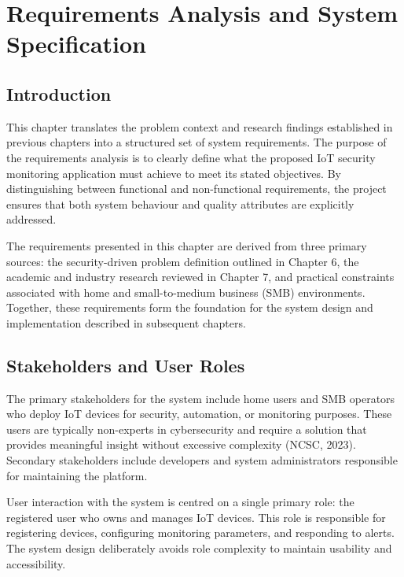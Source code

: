 \chapter{Requirements Analysis and System Specification}
\label{ch:req}

\section{Introduction}

This chapter translates the problem context and research findings established in previous chapters into a structured set of system requirements. The purpose of the requirements analysis is to clearly define what the proposed IoT security monitoring application must achieve to meet its stated objectives. By distinguishing between functional and non-functional requirements, the project ensures that both system behaviour and quality attributes are explicitly addressed.

The requirements presented in this chapter are derived from three primary sources: the security-driven problem definition outlined in Chapter 6, the academic and industry research reviewed in Chapter 7, and practical constraints associated with home and small-to-medium business (SMB) environments. Together, these requirements form the foundation for the system design and implementation described in subsequent chapters.

\section{Stakeholders and User Roles}

The primary stakeholders for the system include home users and SMB operators who deploy IoT devices for security, automation, or monitoring purposes. These users are typically non-experts in cybersecurity and require a solution that provides meaningful insight without excessive complexity (NCSC, 2023). Secondary stakeholders include developers and system administrators responsible for maintaining the platform.

User interaction with the system is centred on a single primary role: the registered user who owns and manages IoT devices. This role is responsible for registering devices, configuring monitoring parameters, and responding to alerts. The system design deliberately avoids role complexity to maintain usability and accessibility.

